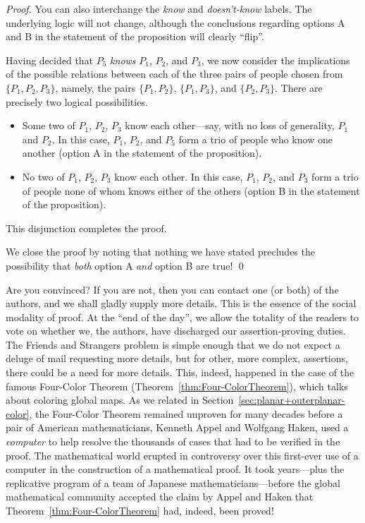 \begin{proof}
{\begin{minipage}{0.95\textwidth}
You can also interchange the {\em know} and {\em doesn't-know} labels.
The underlying logic will not change, although the conclusions
regarding options A and B in the statement of the proposition will
clearly ``flip''.
\end{minipage} }

\bigskip

\noindent
Having decided that $P_5$ {\em knows} $P_1$, $P_2$, and $P_3$, we now
consider the implications of the possible relations between each of
the three pairs of people chosen from $\{P_1, P_2, P_3\}$, namely, the
pairs  $\{P_1, P_2\}$, $\{P_1, P_3\}$, and $\{P_2, P_3\}$.  There
are precisely two logical possibilities.
\begin{itemize}
\item
Some two of $P_1$, $P_2$, $P_3$ know each other---say, with no loss of
generality, $P_1$ and $P_2$.  In this case, $P_1$, $P_2$, and $P_5$
form a trio of people who know one another (option A in the statement
of the proposition).
\item
No two of $P_1$, $P_2$, $P_3$ know each other.  In this case, $P_1$,
$P_2$, and $P_3$ form a trio of people none of whom knows either of
the others (option B in the statement of the proposition).
\end{itemize}
This disjunction completes the proof.

We close the proof by noting that nothing we have stated precludes the
possibility that {\em both} option A {\em and} option B are true!  \qed
\end{proof}

Are you convinced?  If you are not, then you can contact one (or both)
of the authors, and we shall gladly supply more details.  This is the
essence of the social modality of proof.  At the ``end of the day'',
we allow the totality of the readers to vote on whether we, the
authors, have discharged our assertion-proving duties.  The Friends
and Strangers problem is simple enough that we do not expect a deluge
of mail requesting more details, but for other, more complex,
assertions, there could be a need for more details.  This, indeed,
happened in the case of the famous Four-Color Theorem
(Theorem~\ref{thm:Four-ColorTheorem}), which talks about coloring
global maps.  As we related in
Section~\ref{sec:planar+outerplanar-color}, the Four-Color Theorem
remained unproven for many decades before a pair of American
mathematicians, Kenneth Appel  and Wolfgang
Haken,  used a {\it computer} to help resolve
the thousands of cases that had to be verified in the proof.  The
mathematical world erupted in controversy over this first-ever use of
a computer in the construction of a mathematical proof.  It took
years---plus the replicative program of a team of Japanese
mathematicians---before the global mathematical community accepted the
claim by Appel and Haken that Theorem~\ref{thm:Four-ColorTheorem} had,
indeed, been proved!

